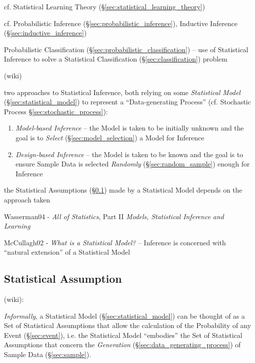 \fist cf. Statistical Learning Theory (\S\ref{sec:statistical_learning_theory})

\fist cf. Probabilistic Inference
(\S\ref{sec:probabilistic_inference}), Inductive Inference
(\S\ref{sec:inductive_inference})

\fist Probabilistic Classification (\S\ref{sec:probabilistic_classification}) --
use of Statistical Inference to solve a Statistical Classification
(\S\ref{sec:classification}) problem

(wiki)

two approaches to Statistical Inference, both relying on some \emph{Statistical
  Model} (\S\ref{sec:statistical_model}) to represent a ``Data-generating
Process'' (cf. Stochastic Process \S\ref{sec:stochastic_process}):
\begin{enumerate}
  \item \emph{Model-based Inference} -- the Model is taken to be initially
    unknown and the goal is to \emph{Select} (\S\ref{sec:model_selection}) a
    Model for Inference
  \item \emph{Design-based Inference} -- the Model is taken to be known and the
    goal is to ensure Sample Data is selected \emph{Randomly}
    (\S\ref{sec:random_sample}) enough for Inference
\end{enumerate}
the Statistical Assumptions (\S\ref{sec:statistical_assumption}) made by a
Statistical Model depends on the approach taken

Wasserman04 - \emph{All of Statistics}, Part II \emph{Models, Statistical
  Inference and Learning}

McCullagh02 - \emph{What is a Statistical Model?} -- Inference is concerned with
``natural extension'' of a Statistical Model



\subsection{Statistical Assumption}\label{sec:statistical_assumption}

(wiki):

\emph{Informally}, a Statistical Model (\S\ref{sec:statistical_model}) can be
thought of as a Set of Statistical Assumptions that allow the calculation of the
Probability of any Event (\S\ref{sec:event}), i.e. the Statistical Model
``embodies'' the Set of Statistical Assumptions that concern the
\emph{Generation} (\S\ref{sec:data_generating_process}) of Sample Data
(\S\ref{sec:sample}).

